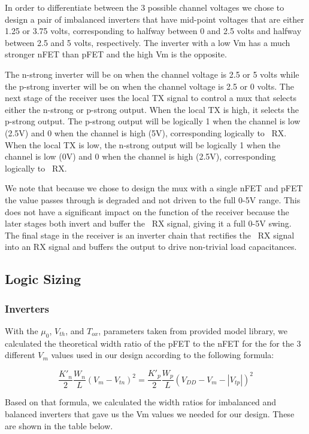 \documentclass[12pt, letterpaper]{article}
\begin{document}
In order to differentiate between the 3 possible channel voltages we chose to design a pair of imbalanced inverters that have mid-point voltages that are either 1.25 or 3.75 volts, corresponding to halfway between 0 and 2.5 volts and halfway between 2.5 and 5 volts, respectively.
The inverter with a low Vm has a much stronger nFET than pFET and the high Vm is the opposite.
\par
The n-strong inverter will be on when the channel voltage is 2.5 or 5 volts while the p-strong inverter will be on when the channel voltage is 2.5 or 0 volts.
The next stage of the receiver uses the local TX signal to control a mux that selects either the n-strong or p-strong output.
When the local TX is high, it selects the p-strong output.
The p-strong output will be logically 1 when the channel is low (2.5V) and 0 when the channel is high (5V), corresponding logically to ~RX.
When the local TX is low, the n-strong output will be logically 1 when the channel is low (0V) and 0 when the channel is high (2.5V), corresponding logically to ~RX.
\par
We note that because we chose to design the mux with a single nFET and pFET the value passes through is degraded and not driven to the full 0-5V range.
This does not have a significant impact on the function of the receiver because the later stages both invert and buffer the ~RX signal, giving it a full 0-5V swing.
The final stage in the receiver is an inverter chain that rectifies the ~RX signal into an RX signal and buffers the output to drive non-trivial load capacitances.

\subsection{Logic Sizing}

\subsubsection{Inverters}
With the $\mu_0$, $V_{th}$, and $T_{ox}$, parameters taken from provided model library, we calculated the theoretical width ratio of the pFET to the nFET for the for the 3 different $V_m$ values used in our design according to the following formula:

$$
\frac{K'_n}{2} \frac{W_n}{L} (V_m - V_{tn}) ^ 2 =
\frac{K'_p}{2} \frac{W_p}{L} (V_{DD} - V_m - |V_{tp}|) ^ 2
$$

Based on that formula, we calculated the width ratios for imbalanced and balanced inverters that gave us the Vm values we needed for our design.
These are shown in the table below.
\end{document}
